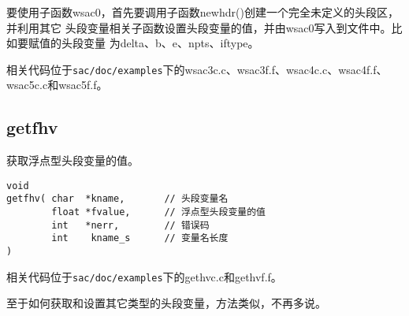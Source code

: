 要使用子函数wsac0，首先要调用子函数newhdr()创建一个完全未定义的头段区，并利用其它
头段变量相关子函数设置头段变量的值，并由wsac0写入到文件中。比如要赋值的头段变量
为delta、b、e、npts、iftype。

相关代码位于\lstinline{sac/doc/examples}下的wsac3c.c、wsac3f.f、wsac4c.c、wsac4f.f、
wsac5c.c和wsac5f.f。

\subsection{getfhv}
获取浮点型头段变量的值。
\begin{lstlisting}[style=C]
void                                                                                
getfhv( char  *kname,       // 头段变量名
        float *fvalue,      // 浮点型头段变量的值                                              
        int   *nerr,        // 错误码                                    
        int    kname_s      // 变量名长度
)
\end{lstlisting}

相关代码位于\lstinline{sac/doc/examples}下的gethvc.c和gethvf.f。

至于如何获取和设置其它类型的头段变量，方法类似，不再多说。
